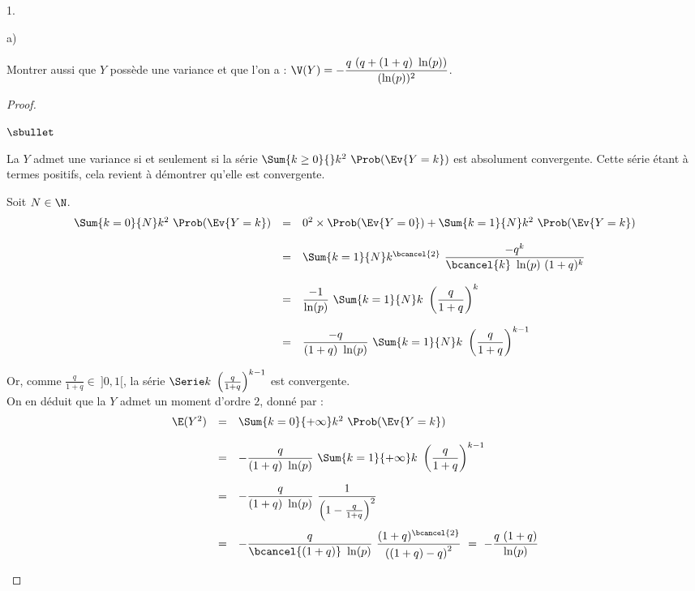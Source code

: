 \documentclass[11pt]{article}%
\begin{document}
\begin{noliste}{1.}
\begin{noliste}{a)}
  \item Montrer aussi que $Y$ possède une variance et que l'on a :
    $\V(Y) = -\dfrac{q \ (q + (1 + q) \ \ln(p))}{(\ln(p))^{2}}$.

    \begin{proof}~%
      \begin{noliste}{$\sbullet$}
      \item La \var $Y$ admet une variance si et seulement si la série
        $\Sum{k \geq 0}{} k^2 \ \Prob(\Ev{Y = k})$ est absolument
        convergente. Cette série étant à termes positifs, cela
        revient à démontrer qu'elle est convergente.

      \item Soit $N \in \N$.
        \[
        \begin{array}{rcl}
          \Sum{k = 0}{N} k^2 \ \Prob(\Ev{Y = k}) & = & 0^2 \times
          \Prob(\Ev{Y = 0}) + \Sum{k = 1}{N} k^2 \ \Prob(\Ev{Y = k}) 
          \\[.4cm]
          & = & \Sum{k = 1}{N} k^{\bcancel{2}} \ \dfrac{-q^k}{\bcancel{k}
            \ \ln(p) \ (1+q)^k} 
          \\[.6cm]
          & = & \dfrac{-1}{\ln(p)} \ \Sum{k = 1}{N} k \ 
          \left(\dfrac{q}{1+q} \right)^k 
          \\[.6cm]
          & = & \dfrac{-q}{(1+q) \ \ln(p)} \ \Sum{k = 1}{N} k \ 
          \left(\dfrac{q}{1+q} \right)^{k-1} 
        \end{array}
        \]




      \item Or, comme $\frac{q}{1+q} \in \ ]0, 1[$, la série $\Serie k
        \ \left( \frac{q}{1+q} \right)^{k-1}$ est convergente.\\
        On en déduit que la \var $Y$ admet un moment d'ordre $2$,
        donné par :
        \[
        \begin{array}{rcl}
          \E(Y^2) & = & \Sum{k=0}{+\infty} k^2 \ \Prob(\Ev{Y = k}) 
          \\[.4cm]
          & = & -\dfrac{q}{(1+q) \ \ln(p)} \ \Sum{k=1}{+\infty} k \ \left(
            \dfrac{q}{1+q} \right)^{k-1} 
          \\[.6cm]
          & = & -\dfrac{q}{(1+q) \ \ln(p)} \ \dfrac{1}{\left( 1 -
              \frac{q}{1+q} \right)^2} 
          \\[.8cm]
          & = & -\dfrac{q}{\bcancel{(1+q)} \ \ln(p)} \ \dfrac{(1 +
            q)^{\bcancel{2}}}{\left( (1+q) - q \right)^2} 
          \ = \ - \dfrac{q \ (1+q)}{\ln(p)}
        \end{array}
        \]


\end{noliste}
\end{proof}
\end{noliste}
\end{noliste}
\end{document}
